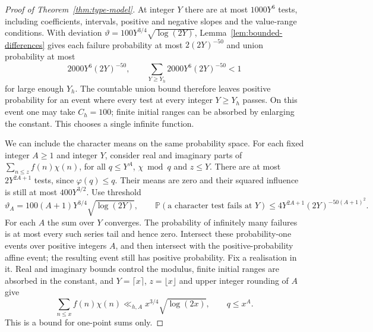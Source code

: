 \documentclass[11pt]{article}
\theoremstyle{definition}
\newcommand{\Prob}{\mathbb P}
\theoremstyle{remark}
\numberwithin{equation}{section}
\begin{document}
\begin{proof}[Proof of Theorem~\ref{thm:type-model}]
At integer $Y$ there are at most $1000Y^6$ tests, including coefficients, intervals, positive and
negative slopes and the value-range conditions. With deviation
$\vartheta=100Y^{3/4}\sqrt{\log(2Y)}$, Lemma~\ref{lem:bounded-differences} gives each failure probability
at most $2(2Y)^{-50}$ and union probability at most
\begin{equation}\label{eq:c-affine-failure}
 2000Y^6(2Y)^{-50},\qquad
 \sum_{Y\ge Y_h}2000Y^6(2Y)^{-50}<1
\end{equation}
for large enough $Y_h$. The countable union bound therefore leaves positive probability for an event
where every test at every integer $Y\ge Y_h$ passes. On this event one may take $C_h=100$;
finite initial ranges can be absorbed by enlarging the constant. This chooses a single infinite function.

We can include the character means on the same probability space. For each fixed integer $A\ge1$ and
integer $Y$, consider real and imaginary parts of $\sum_{n\le z}f(n)\chi(n)$, for all $q\le Y^A$,
$\chi\bmod q$ and $z\le Y$. There are at most $2Y^{2A+1}$ tests, since $\varphi(q)\le q$.
Their means are zero and their squared influence is still at most $400Y^{3/2}$.
Use threshold
\begin{equation}\label{eq:c-character-failure}
 \vartheta_A=100(A+1)Y^{3/4}\sqrt{\log(2Y)},\qquad
 \Prob(\text{a character test fails at }Y)
 \le4Y^{2A+1}(2Y)^{-50(A+1)^2}.
\end{equation}
For each $A$ the sum over $Y$ converges. The probability of infinitely many failures is at most every
such series tail and hence zero. Intersect these probability-one events over positive integers $A$,
and then intersect with the positive-probability affine event; the resulting event still has positive
probability. Fix a realisation in it. Real and imaginary bounds control the modulus, finite initial
ranges are absorbed in the constant, and $Y=\lceil x\rceil$, $z=\lfloor x\rfloor$ and upper integer
rounding of $A$ give
\begin{equation}\label{eq:c-character}
 \sum_{n\le x}f(n)\chi(n)\ll_{h,A}x^{3/4}\sqrt{\log(2x)},\qquad q\le x^A.
\end{equation}
This is a bound for one-point sums only.


\end{proof}
\end{document}
